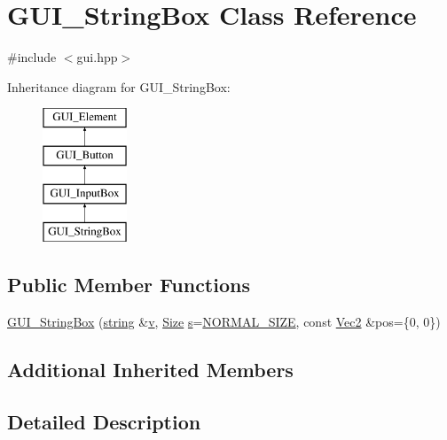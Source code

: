 \hypertarget{class_g_u_i___string_box}{\section{G\-U\-I\-\_\-\-String\-Box Class Reference}
\label{class_g_u_i___string_box}
}


{\ttfamily \#include $<$gui.\-hpp$>$}

Inheritance diagram for G\-U\-I\-\_\-\-String\-Box\-:\begin{figure}[H]
\begin{center}
\leavevmode
\includegraphics[height=4.000000cm]{class_g_u_i___string_box}
\end{center}
\end{figure}
\subsection*{Public Member Functions}
\begin{DoxyCompactItemize}
\item 
\hyperlink{class_g_u_i___string_box_aa92716a9f25084332764bf8eb4095908}{G\-U\-I\-\_\-\-String\-Box} (\hyperlink{_s_d_l__opengl__glext_8h_ae84541b4f3d8e1ea24ec0f466a8c568b}{string} \&\hyperlink{_s_d_l__opengl_8h_a10a82eabcb59d2fcd74acee063775f90}{v}, \hyperlink{gui_8hpp_a1c40db1d9b56c27240e420765695f1c4}{Size} \hyperlink{_s_d_l__opengl_8h_a4af680a6c683f88ed67b76f207f2e6e4}{s}=\hyperlink{gui_8hpp_a1c40db1d9b56c27240e420765695f1c4a5ea6a19a48a3ca328c0a05aa8c5ac1af}{N\-O\-R\-M\-A\-L\-\_\-\-S\-I\-Z\-E}, const \hyperlink{class_vec2}{Vec2} \&pos=\{0, 0\})
\end{DoxyCompactItemize}
\subsection*{Additional Inherited Members}


\subsection{Detailed Description}


